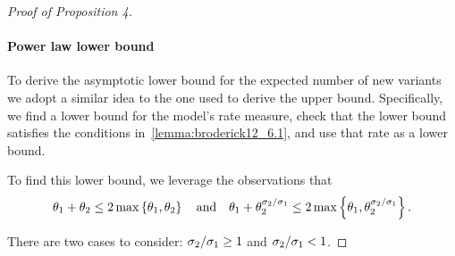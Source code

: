 \begin{proof}[Proof of Proposition 4]
\paragraph{Power law lower bound}

To derive the asymptotic lower bound for the expected  number of new variants we adopt a similar idea to the one used to derive the upper bound.
Specifically, we find a lower bound for the model's rate measure, check that the lower bound satisfies the conditions in~\cref{lemma:broderick12_6.1}, and use that rate as a lower bound. 

To find this lower bound, we leverage the observations that 
\begin{equation}
	\theta_{1}+\theta_{2}\le 2\max\left\{ \theta_{1},\theta_{2} \right\}
	\quad\text{and}\quad
	\theta_{1}+\theta_{2}^{\sigma_{2}/\sigma_{1}}\le 2\max\left\{ \theta_{1},\theta_{2}^{\sigma_{2}/\sigma_{1}} \right\}.
\end{equation}


There are two cases to consider: $\sigma_{2}/\sigma_{1}\ge 1$ and $\sigma_{2}/\sigma_{1} < 1$. 


\end{proof}
